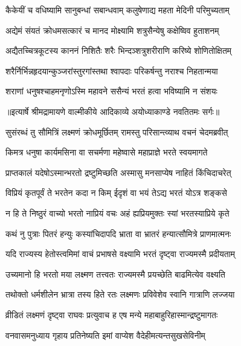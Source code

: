 \twolineshloka
{कैकेयीं च वधिष्यामि सानुबन्धां सबान्धवाम्}
{कलुषेणाद्य महता मेदिनी परिमुच्यताम्} %

\twolineshloka
{अद्येमं संयतं क्रोधमसत्कारं च मानद}
{मोक्ष्यामि शत्रुसैन्येषु कक्षेष्विव हुताशनम्} %

\twolineshloka
{अद्यैतच्चित्रकूटस्य काननं निशितैः शरैः}
{भिन्दञ्शत्रुशरीराणि करिष्ये शोणितोक्षितम्} %

\twolineshloka
{शरैर्निर्भिन्नहृदयान्कुञ्जरांस्तुरगांस्तथा}
{श्वापदाः परिकर्षन्तु नराश्च निहतान्मया} %

\twolineshloka
{शराणां धनुषश्चाहमनृणोऽस्मि महावने}
{ससैन्यं भरतं हत्वा भविष्यामि न संशयः} %


{॥इत्यार्षे श्रीमद्रामायणे वाल्मीकीये आदिकाव्ये अयोध्याकाण्डे नवतितमः सर्गः॥}


\twolineshloka
{सुसंरब्धं तु सौमित्रिं लक्ष्मणं क्रोधमूर्छितम्}
{रामस्तु परिसान्त्व्याथ वचनं चेदमब्रवीत्} %

\twolineshloka
{किमत्र धनुषा कार्यमसिना वा सचर्मणा}
{महेष्वासे महाप्राज्ञे भरते स्वयमागते} %

\twolineshloka
{प्राप्तकालं यदेषोऽस्मान्भरतो द्रष्टुमिच्छति}
{अस्मासु मनसाप्येष नाहितं किंचिदाचरेत्} %

\twolineshloka
{विप्रियं कृतपूर्वं ते भरतेन कदा न किम्}
{ईदृशं वा भयं तेऽद्य भरतं योऽत्र शङ्कसे} %

\twolineshloka
{न हि ते निष्ठुरं वाच्यो भरतो नाप्रियं वचः}
{अहं ह्यप्रियमुक्तः स्यां भरतस्याप्रिये कृते} %

\twolineshloka
{कथं नु पुत्राः पितरं हन्युः कस्यांचिदापदि}
{भ्राता वा भ्रातरं हन्यात्सौमित्रे प्राणमात्मनः} %

\twolineshloka
{यदि राज्यस्य हेतोस्त्वमिमां वाचं प्रभाषसे}
{वक्ष्यामि भरतं दृष्ट्वा राज्यमस्मै प्रदीयताम्} %

\twolineshloka
{उच्यमानो हि भरतो मया लक्ष्मण तत्त्वतः}
{राज्यमस्मै प्रयच्छेति बाढमित्येव वक्ष्यति} %

\twolineshloka
{तथोक्तो धर्मशीलेन भ्रात्रा तस्य हिते रतः}
{लक्ष्मणः प्रविवेशेव स्वानि गात्राणि लज्जया} %

\twolineshloka
{व्रीडितं लक्ष्मणं दृष्ट्वा राघवः प्रत्युवाच ह}
{एष मन्ये महाबाहुरिहास्मान्द्रष्टुमागतः} %

\twolineshloka
{वनवासमनुध्याय गृहाय प्रतिनेष्यति}
{इमां वाप्येश वैदेहीमत्यन्तसुखसेविनीम्} %

